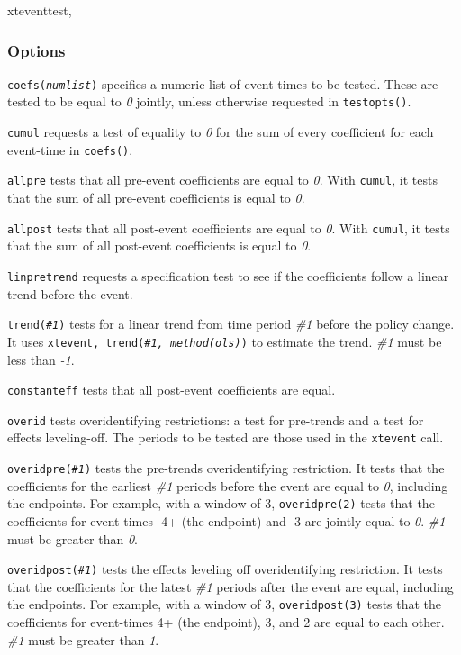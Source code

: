 \documentclass[12pt]{article}
\begin{document}
\begin{stsyntax}
	xteventtest,
\end{stsyntax}

\subsubsection{Options}
\hangpara
\texttt{coefs({\it numlist})} specifies a numeric list of event-times to be tested. These are tested to be equal to
{\it 0} jointly, unless otherwise requested in \texttt{testopts()}.

\hangpara
\texttt{cumul} requests a test of equality to {\it 0} for the sum of every coefficient for each event-time in \texttt{coefs()}.

\hangpara
\texttt{allpre} tests that all pre-event coefficients are equal to {\it 0}.
With \texttt{cumul}, it tests that the sum of all pre-event coefficients is equal to {\it 0}.

\hangpara
\texttt{allpost} tests that all post-event coefficients are equal to {\it 0}.
With \texttt{cumul}, it tests that the sum of all post-event coefficients is equal to {\it 0}.

\hangpara
\texttt{linpretrend} requests a specification test to see if the coefficients follow a linear trend before the event.

\hangpara
\texttt{trend({\it \#1})} tests for a linear trend from time period {\it \#1} before the policy change. It uses \texttt{xtevent, trend({\it \#1, method(ols)})} to estimate the trend. {\it \#1} must be less than {\it -1}.

\hangpara
\texttt{constanteff} tests that all post-event coefficients are equal.

\hangpara
\texttt{overid} tests overidentifying restrictions: a test for pre-trends and a test for effects leveling-off. The periods to be tested are those used in the \texttt{xtevent} call.

\hangpara
\texttt{overidpre({\it \#1})} tests the pre-trends overidentifying restriction. It tests that the coefficients for the earliest {\it \#1} periods before the event are equal to {\it 0}, including the endpoints.
For example, with a window of 3, \texttt{overidpre(2)} tests that the coefficients for event-times -4+ (the endpoint) and -3 are jointly equal to {\it 0}.
{\it \#1} must be greater than {\it 0}.

\hangpara
\texttt{overidpost({\it \#1})} tests the effects leveling off overidentifying restriction. It tests that the coefficients for the latest {\it \#1} periods after the event are equal, including the endpoints.
For example, with a window of 3, \texttt{overidpost(3)} tests that the coefficients for event-times 4+ (the endpoint), 3, and 2 are equal to each other.
{\it \#1} must be greater than {\it 1}.
\end{document}
